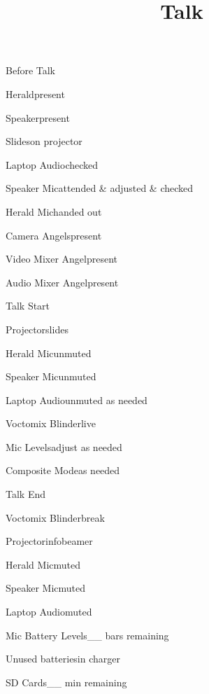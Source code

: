 \def\papersize{5}




\title{Talk}

\begin{checklist}{Before Talk}
  \item{Herald}{present}
  \item{Speaker}{present}
  \item{Slides}{on projector}
  \item{Laptop Audio}{checked}
  \item{Speaker Mic}{attended \& adjusted \& checked}
  \item{Herald Mic}{handed out}
  \item{Camera Angels}{present}
  \item{Video Mixer Angel}{present}
  \item{Audio Mixer Angel}{present}
\end{checklist}

\begin{checklist}{Talk Start}
  \item{Projector}{slides}
  \item{Herald Mic}{unmuted}
  \item{Speaker Mic}{unmuted}
  \item{Laptop Audio}{unmuted as needed}
  \item{Voctomix Blinder}{live}
  \item{Mic Levels}{adjust as needed}

  \item{Composite Mode}{as needed}
\end{checklist}

\begin{checklist}{Talk End}
  \item{Voctomix Blinder}{break}
  \item{Projector}{infobeamer}
  \item{Herald Mic}{muted}
  \item{Speaker Mic}{muted}
  \item{Laptop Audio}{muted}
  \item{Mic Battery Levels}{\_\_ bars remaining}
  \item{Unused batteries}{in charger}

  \item{SD Cards}{\_\_ min remaining}
\end{checklist}


